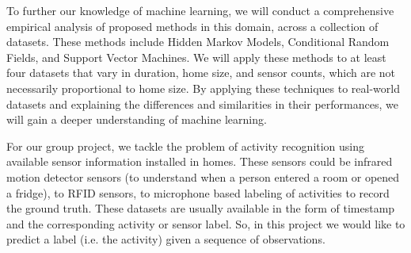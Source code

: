 \documentclass[11pt, oneside]{article}   	%
\begin{document}
To further our knowledge of machine learning, we will conduct a comprehensive empirical analysis of proposed methods in this domain, across a collection of datasets. These methods include Hidden Markov Models, Conditional Random Fields, and Support Vector Machines. We will apply these methods to at least four datasets that vary in duration, home size, and sensor counts, which are not necessarily proportional to home size. By applying these techniques to real-world datasets and explaining the differences and similarities in their performances, we will gain a deeper understanding of machine learning.

For our group project, we tackle the problem of activity recognition using available sensor information installed in homes. These sensors could be infrared motion detector sensors (to understand when a person entered a room or opened a fridge), to RFID sensors, to microphone based labeling of activities to record the ground truth. These datasets are usually available in the form of timestamp and the corresponding activity or sensor label. So, in this project we would like to predict a label (i.e. the activity) given a sequence of observations. 
\end{document}
